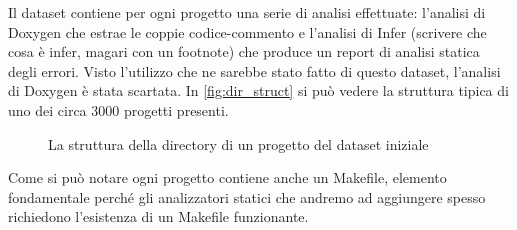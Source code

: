 Il dataset contiene per ogni progetto una serie di analisi effettuate: l'analisi di Doxygen che estrae le coppie codice-commento e l'analisi di Infer (scrivere che cosa è infer, magari con un footnote) che produce un report di analisi statica degli errori.
Visto l'utilizzo che ne sarebbe stato fatto di questo dataset, l'analisi di Doxygen è stata scartata. In \autoref{fig:dir_struct} si può vedere la struttura tipica di uno dei circa 3000 progetti presenti.
\begin{figure}
    \centering
    \caption{La struttura della directory di un progetto del dataset iniziale}
    \label{fig:dir_struct}
\end{figure}

Come si può notare ogni progetto contiene anche un Makefile, elemento fondamentale perché gli analizzatori statici che andremo ad aggiungere spesso richiedono l'esistenza di un Makefile funzionante.


